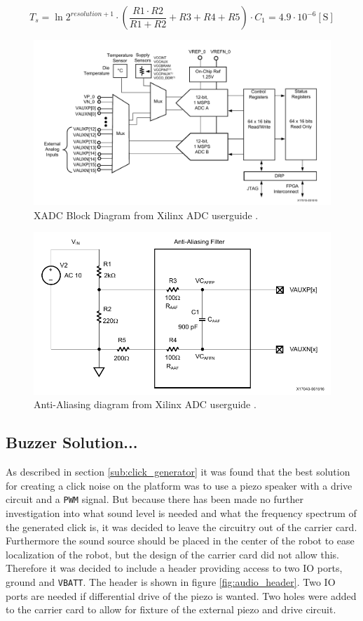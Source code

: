 \begin{equation}
	\label{eq:aliasing}
	T_{s}=\ln{2^{resolution+1}}\cdot \left(\frac{R1\cdot R2}{R1 + R2}+R3+R4+R5\right)\cdot C_1 = 4.9\cdot 10^{-6}[\text{S}]
\end{equation}

\begin{figure}
	\centering
	\includegraphics[width=1\linewidth]{graphics/adc.pdf}
	\caption{XADC Block Diagram from Xilinx ADC userguide \cite{adc}.}
	\label{fig:adc}
\end{figure}


\begin{figure}
	\centering
	\includegraphics[width=0.8\linewidth]{graphics/anti_aliasing.pdf}
	\caption{Anti-Aliasing diagram from Xilinx ADC userguide \cite{adc}.}
	\label{fig:anti_a}
\end{figure}


\subsection{Buzzer Solution...}	
As described in section \ref{sub:click_generator} it was found that the best solution for creating a click noise on the platform was to use a piezo speaker with a drive circuit and a \texttt{PWM} signal.
But because there has been made no further investigation into what sound level is needed and what the frequency spectrum of the generated click is, it was decided to leave the circuitry out of the carrier card.
Furthermore the sound source should be placed in the center of the robot to ease localization of the robot, but the design of the carrier card did not allow this.
Therefore it was decided to include a header providing access to two IO ports, ground and \texttt{VBATT}.
The header is shown in figure \ref{fig:audio_header}.
Two IO ports are needed if differential drive of the piezo is wanted.
Two holes were added to the carrier card to allow for fixture of the external piezo and drive circuit.

